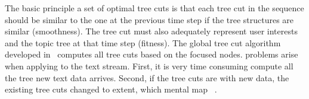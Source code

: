 The basic principle  a set of optimal tree cuts is that each tree cut in the sequence should be similar to the one at the previous time step if the tree structures are similar (smoothness).
The tree cut must also adequately represent user interests and the topic tree at that time step (fitness).
The global tree cut algorithm developed in~\cite{cui2014} computes all tree cuts  based on the focused nodes.
 problems arise when applying  to the text stream.
First, it is very time consuming  compute all the tree  new text data arrives.
Second, if the tree cuts are  with  new data,  the existing tree cuts  changed to  extent, which  mental map ~\cite{Woods1984}.


